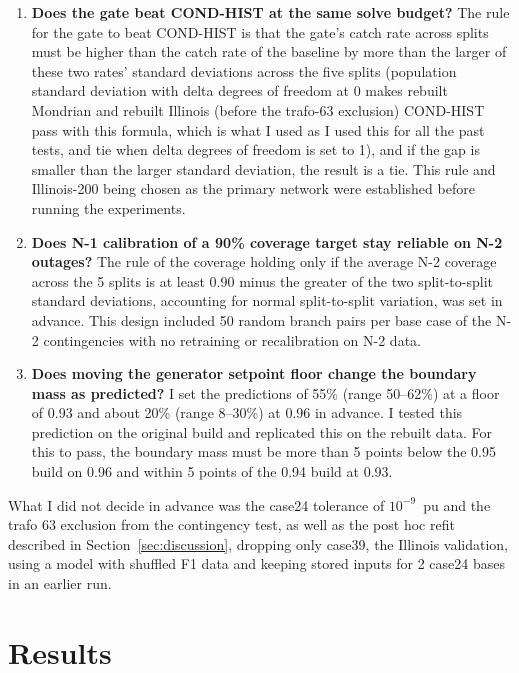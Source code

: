 \documentclass[12pt]{article}
\begin{document}
\begin{enumerate}

\item \textbf{Does the gate beat COND-HIST at the same solve budget?} The rule for the gate to beat COND-HIST is that the gate's catch rate across splits must be higher than the catch rate of the baseline by more than the larger of these two rates' standard deviations across the five splits (population standard deviation with delta degrees of freedom at 0 makes rebuilt Mondrian and rebuilt Illinois (before the trafo-63 exclusion) COND-HIST pass with this formula, which is what I used as I used this for all the past tests, and tie when delta degrees of freedom is set to 1), and if the gap is smaller than the larger standard deviation, the result is a tie. This rule and Illinois-200 being chosen as the primary network were established before running the experiments.
\item\label{item:n2} \textbf{Does N-1 calibration of a 90\% coverage target stay reliable on N-2 outages?} The rule of the coverage holding only if the average N-2 coverage across the 5 splits is at least 0.90 minus the greater of the two split-to-split standard deviations, accounting for normal split-to-split variation, was set in advance. This design included 50 random branch pairs per base case of the N-2 contingencies with no retraining or recalibration on N-2 data. 
\item \textbf{Does moving the generator setpoint floor change the boundary mass as predicted?} I set the predictions of 55\% (range 50--62\%) at a floor of 0.93 and about 20\% (range 8--30\%) at 0.96 in advance. I tested this prediction on the original build and replicated this on the rebuilt data. For this to pass, the boundary mass must be more than 5 points below the 0.95 build on 0.96 and within 5 points of the 0.94 build at 0.93.
\end{enumerate}

What I did not decide in advance was the case24 tolerance of $10^{-9}$~pu and the trafo 63 exclusion from the contingency test, as well as the post hoc refit described in Section~\ref{sec:discussion}, dropping only case39, the Illinois validation, using a model with shuffled F1 data and keeping stored inputs for 2 case24 bases in an earlier run.


\section{Results}
\label{sec:results}
\end{document}
